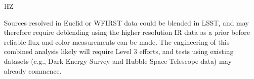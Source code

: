 {\begin{tasklist}{HZ}
\begin{task}
{Sources resolved in Euclid or WFIRST data could be blended in LSST, and may therefore
require deblending using the higher resolution IR data as a prior before reliable flux and
color measurements can be made. The engineering of this combined analysis likely will require
Level 3 efforts, and tests using existing datasets (e.g., Dark Energy Survey and Hubble
Space Telescope data) may already commence.}
~\\
\end{task}


\end{tasklist}}
